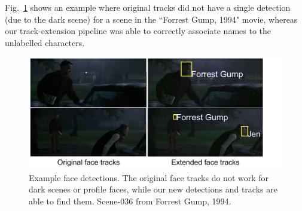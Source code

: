 Fig.~\ref{fig:c1c_results} shows an example where original tracks did not have a single detection (due to the dark scene) for a scene in the ``Forrest Gump, 1994" movie, whereas our track-extension pipeline was able to correctly associate names to the unlabelled characters.

\begin{figure}[t]
\centering
\includegraphics[width=0.80\linewidth]{Figures/c1c_results.pdf}
\vspace{-6mm}
\caption{Example face detections. The original face tracks do not work for dark scenes or profile faces, while our new detections and tracks are able to find them. Scene-036 from Forrest Gump, 1994.}
\vspace{-2mm}
\label{fig:c1c_results}
\end{figure}
